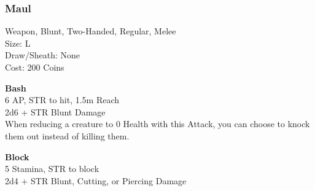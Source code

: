 \subsubsection{Maul}\label{weapon:maul}
Weapon, Blunt, Two-Handed, Regular, Melee\\
Size: L\\
Draw/Sheath: None\\
Cost: 200 Coins

\textbf{Bash}\\
6 AP, STR to hit, 1.5m Reach\\
2d6 + STR Blunt Damage\\
When reducing a creature to 0 Health with this Attack, you can choose to knock them out instead of killing them.

\textbf{Block}\\
5 Stamina, STR to block\\
2d4 + \texttimes STR Blunt, Cutting, or Piercing Damage